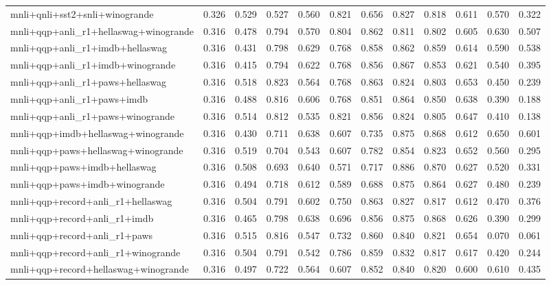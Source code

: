 \begin{table}[t]
\begin{tabular}{lrrrrrrrrrrr}
    mnli+qnli+sst2+snli+winogrande & 0.326 & 0.529 & 0.527 & 0.560 & 0.821 & 0.656 & 0.827 & 0.818 & 0.611 & 0.570 & 0.322 \\
    mnli+qqp+anli\_r1+hellaswag+winogrande & 0.316 & 0.478 & 0.794 & 0.570 & 0.804 & 0.862 & 0.811 & 0.802 & 0.605 & 0.630 & 0.507 \\
    mnli+qqp+anli\_r1+imdb+hellaswag & 0.316 & 0.431 & 0.798 & 0.629 & 0.768 & 0.858 & 0.862 & 0.859 & 0.614 & 0.590 & 0.538 \\
    mnli+qqp+anli\_r1+imdb+winogrande & 0.316 & 0.415 & 0.794 & 0.622 & 0.768 & 0.856 & 0.867 & 0.853 & 0.621 & 0.540 & 0.395 \\
    mnli+qqp+anli\_r1+paws+hellaswag & 0.316 & 0.518 & 0.823 & 0.564 & 0.768 & 0.863 & 0.824 & 0.803 & 0.653 & 0.450 & 0.239 \\
    mnli+qqp+anli\_r1+paws+imdb & 0.316 & 0.488 & 0.816 & 0.606 & 0.768 & 0.851 & 0.864 & 0.850 & 0.638 & 0.390 & 0.188 \\
    mnli+qqp+anli\_r1+paws+winogrande & 0.316 & 0.514 & 0.812 & 0.535 & 0.821 & 0.856 & 0.824 & 0.805 & 0.647 & 0.410 & 0.138 \\
    mnli+qqp+imdb+hellaswag+winogrande & 0.316 & 0.430 & 0.711 & 0.638 & 0.607 & 0.735 & 0.875 & 0.868 & 0.612 & 0.650 & 0.601 \\
    mnli+qqp+paws+hellaswag+winogrande & 0.316 & 0.519 & 0.704 & 0.543 & 0.607 & 0.782 & 0.854 & 0.823 & 0.652 & 0.560 & 0.295 \\
    mnli+qqp+paws+imdb+hellaswag & 0.316 & 0.508 & 0.693 & 0.640 & 0.571 & 0.717 & 0.886 & 0.870 & 0.627 & 0.520 & 0.331 \\
    mnli+qqp+paws+imdb+winogrande & 0.316 & 0.494 & 0.718 & 0.612 & 0.589 & 0.688 & 0.875 & 0.864 & 0.627 & 0.480 & 0.239 \\
    mnli+qqp+record+anli\_r1+hellaswag & 0.316 & 0.504 & 0.791 & 0.602 & 0.750 & 0.863 & 0.827 & 0.817 & 0.612 & 0.470 & 0.376 \\
    mnli+qqp+record+anli\_r1+imdb & 0.316 & 0.465 & 0.798 & 0.638 & 0.696 & 0.856 & 0.875 & 0.868 & 0.626 & 0.390 & 0.299 \\
    mnli+qqp+record+anli\_r1+paws & 0.316 & 0.515 & 0.816 & 0.547 & 0.732 & 0.860 & 0.840 & 0.821 & 0.654 & 0.070 & 0.061 \\
    mnli+qqp+record+anli\_r1+winogrande & 0.316 & 0.504 & 0.791 & 0.542 & 0.786 & 0.859 & 0.832 & 0.817 & 0.617 & 0.420 & 0.244 \\
    mnli+qqp+record+hellaswag+winogrande & 0.316 & 0.497 & 0.722 & 0.564 & 0.607 & 0.852 & 0.840 & 0.820 & 0.600 & 0.610 & 0.435 \\

\end{tabular}
\end{table}

